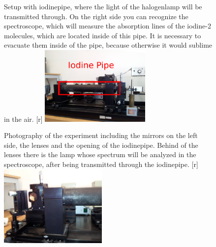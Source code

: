 \begin{figure}[!t]
    \begin{captionbeside}[]{
        Setup with iodinepipe, where the light of the
        halogenlamp will be transmitted through. On the right side
        you can recognize the spectroscope, which will measure
        the absorption lines of the iodine-2 molecules, which
        are located inside of this pipe. It is necessary
        to evacuate them inside of the pipe, because otherwise it
        would sublime in the air.
        }[r]
        \includegraphics[width=0.48\textwidth]{pics/const2}
    \end{captionbeside}
    \label{fig:const2}
\end{figure}
\begin{figure}[!t]
    \begin{captionbeside}[]{
        Photography of the experiment including the mirrors on
        the left side, the lenses and the opening of the iodinepipe.
        Behind of the lenses there is the lamp whose spectrum will
        be analyzed in the spectroscope, after being transmitted
        through the iodinepipe. 
        }[r]
        \includegraphics[width=0.47\textwidth]{pics/const4}
    \end{captionbeside}
    \label{fig:const4}
\end{figure}

